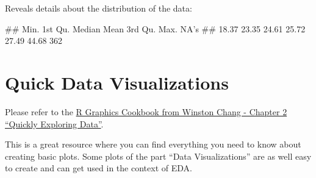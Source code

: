 \documentclass[
  a4paperpaper,
]{book}
\newenvironment{Shaded}{\begin{snugshade}}{\end{snugshade}}
\newcommand{\KeywordTok}[1]{\textcolor[rgb]{0.13,0.29,0.53}{\textbf{#1}}}
\newcommand{\NormalTok}[1]{#1}
\newcommand{\OperatorTok}[1]{\textcolor[rgb]{0.81,0.36,0.00}{\textbf{#1}}}
\let\oldShaded\Shaded
\let\endoldShaded\endShaded
\renewenvironment{Shaded}{\footnotesize\oldShaded}{\endoldShaded}
\let\oldverbatim\verbatim
\let\endoldverbatim\endverbatim
\renewenvironment{verbatim}{\footnotesize\oldverbatim}{\endoldverbatim}
\begin{document}
Reveals details about the distribution of the data:

\begin{Shaded}
\end{Shaded}

\begin{verbatim}
##    Min. 1st Qu.  Median    Mean 3rd Qu.    Max.    NA's 
##   18.37   23.35   24.61   25.72   27.49   44.68     362
\end{verbatim}

\hypertarget{quick-data-visualizations}{%
\section{Quick Data Visualizations}\label{quick-data-visualizations}}

Please refer to the \href{https://r-graphics.org/chapter-quick}{R Graphics Cookbook from Winston Chang - Chapter 2 ``Quickly Exploring Data''}.

This is a great resource where you can find everything you need to know about creating basic plots.
Some plots of the part ``Data Visualizations'' are as well easy to create and can get used in the context of EDA.
\end{document}
